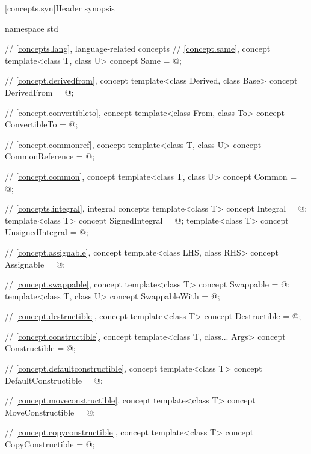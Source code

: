 [concepts.syn]{Header  synopsis}

%
\begin{codeblock}
namespace std {
  // \ref{concepts.lang}, language-related concepts
  // \ref{concept.same}, concept 
  template<class T, class U>
    concept Same = @\seebelow@;

  // \ref{concept.derivedfrom}, concept 
  template<class Derived, class Base>
    concept DerivedFrom = @\seebelow@;

  // \ref{concept.convertibleto}, concept 
  template<class From, class To>
    concept ConvertibleTo = @\seebelow@;

  // \ref{concept.commonref}, concept 
  template<class T, class U>
    concept CommonReference = @\seebelow@;

  // \ref{concept.common}, concept 
  template<class T, class U>
    concept Common = @\seebelow@;

  // \ref{concepts.integral}, integral concepts
  template<class T>
    concept Integral = @\seebelow@;
  template<class T>
    concept SignedIntegral = @\seebelow@;
  template<class T>
    concept UnsignedIntegral = @\seebelow@;

  // \ref{concept.assignable}, concept 
  template<class LHS, class RHS>
    concept Assignable = @\seebelow@;

  // \ref{concept.swappable}, concept 
  template<class T>
    concept Swappable = @\seebelow@;
  template<class T, class U>
    concept SwappableWith = @\seebelow@;

  // \ref{concept.destructible}, concept 
  template<class T>
    concept Destructible = @\seebelow@;

  // \ref{concept.constructible}, concept 
  template<class T, class... Args>
    concept Constructible = @\seebelow@;

  // \ref{concept.defaultconstructible}, concept 
  template<class T>
    concept DefaultConstructible = @\seebelow@;

  // \ref{concept.moveconstructible}, concept 
  template<class T>
    concept MoveConstructible = @\seebelow@;

  // \ref{concept.copyconstructible}, concept 
  template<class T>
    concept CopyConstructible = @\seebelow@;

}
\end{codeblock}
